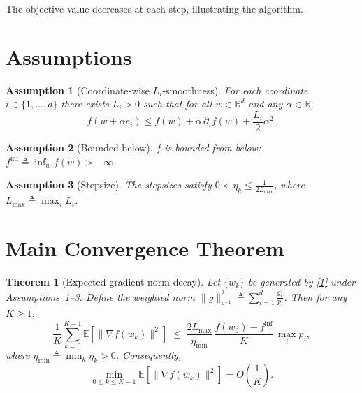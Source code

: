 \documentclass{article}
\newcommand{\E}{\mathbb{E}}
\newcommand{\R}{\mathbb{R}}
\newtheorem{theorem}{Theorem}
\newtheorem{assumption}{Assumption}
\begin{document}
The objective value decreases at each step, illustrating the algorithm.

\newpage
\section*{Assumptions}
\begin{assumption}[Coordinate‑wise $L_{i}$‑smoothness]\label{ass:smooth}
For each coordinate $i\in\{1,\dots ,d\}$ there exists $L_{i}>0$ such that for all $w\in\R^{d}$ and any $\alpha\in\R$,
\[
f(w+\alpha e_{i})\le f(w)+\alpha\,\partial_{i}f(w)+\frac{L_{i}}{2}\alpha^{2}.
\tag{2}
\]
\end{assumption}

\begin{assumption}[Bounded below]\label{ass:lower}
$f$ is bounded from below: $f^{\inf}\triangleq\inf_{w}f(w)>-\infty$.
\end{assumption}

\begin{assumption}[Stepsize]\label{ass:stepsize}
The stepsizes satisfy $0<\eta_{k}\le\displaystyle{}$,
where $L_{\max}\triangleq\max_{i}L_{i}$.
\end{assumption}

\section*{Main Convergence Theorem}
\begin{theorem}[Expected gradient norm decay]\label{thm:main}
Let $\{w_{k}\}$ be generated by \eqref{1} under Assumptions~\ref{ass:smooth}–\ref{ass:stepsize}.
Define the weighted norm $\|g\|_{p^{-1}}^{2}\triangleq\sum_{i=1}^{d}$.
Then for any $K$,
\[
\frac{1}{K}\sum_{k=0}^{K-1}\E\!\left[\|\nabla f(w_{k})\|^{2}\right]
\;\le\;
\frac{2L_{\max}}{\eta_{\min}}\,
\frac{f(w_{0})-f^{\inf}}{K}\,
\max_{i}p_{i},
\tag{3}
\]
where $\eta_{\min}\triangleq\min_{k}\eta_{k}>0$.
Consequently,
\[
\min_{0\le k\le K-1}\E\!\left[\|\nabla f(w_{k})\|^{2}\right]
=O\!\left(\frac{1}{K}\right).
\]
\end{theorem}
\end{document}
